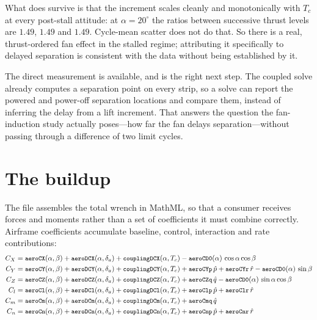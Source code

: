 \documentclass[11pt,a4paper]{article}
\newcommand{\varid}[1]{\texttt{\small #1}}
\newcommand{\dg}{^\circ}
\begin{document}
What does survive is that the increment scales cleanly and monotonically
with $T_c$ at every post-stall attitude: at $\alpha = 20\dg$ the ratios
between successive thrust levels are $1.49$, $1.49$ and $1.49$. Cycle-mean
scatter does not do that. So there is a real, thrust-ordered fan effect in
the stalled regime; attributing it specifically to delayed separation is
consistent with the data without being established by it.

The direct measurement is available, and is the right next step. The
coupled solve already computes a separation point on every strip, so a
solve can report the powered and power-off separation locations and
compare them, instead of inferring the delay from a lift increment. That
answers the question the fan-induction study actually poses---how far the
fan delays separation---without passing through a difference of two limit
cycles.

\section{The buildup}
\label{sec:buildup}

The file assembles the total wrench in MathML, so that a consumer
receives forces and moments rather than a set of coefficients it must
combine correctly. Airframe coefficients accumulate baseline, control,
interaction and rate contributions:
\begin{align}
C_X &= \varid{aeroCX}(\alpha,\beta) + \varid{aeroDCX}(\alpha,\delta_a)
     + \varid{couplingDCX}(\alpha,T_c)
     - \varid{aeroCD0}(\alpha)\,\cos\alpha\cos\beta \\
C_Y &= \varid{aeroCY}(\alpha,\beta) + \varid{aeroDCY}(\alpha,\delta_a)
     + \varid{couplingDCY}(\alpha,T_c)
     + \varid{aeroCYp}\,\hat p + \varid{aeroCYr}\,\hat r
     - \varid{aeroCD0}(\alpha)\,\sin\beta \\
C_Z &= \varid{aeroCZ}(\alpha,\beta) + \varid{aeroDCZ}(\alpha,\delta_a)
     + \varid{couplingDCZ}(\alpha,T_c) + \varid{aeroCZq}\,\hat q
     - \varid{aeroCD0}(\alpha)\,\sin\alpha\cos\beta \\
C_l &= \varid{aeroCl}(\alpha,\beta) + \varid{aeroDCl}(\alpha,\delta_a)
     + \varid{couplingDCl}(\alpha,T_c)
     + \varid{aeroClp}\,\hat p + \varid{aeroClr}\,\hat r \\
C_m &= \varid{aeroCm}(\alpha,\beta) + \varid{aeroDCm}(\alpha,\delta_a)
     + \varid{couplingDCm}(\alpha,T_c) + \varid{aeroCmq}\,\hat q \\
C_n &= \varid{aeroCn}(\alpha,\beta) + \varid{aeroDCn}(\alpha,\delta_a)
     + \varid{couplingDCn}(\alpha,T_c)
     + \varid{aeroCnp}\,\hat p + \varid{aeroCnr}\,\hat r
\end{align}
\end{document}
